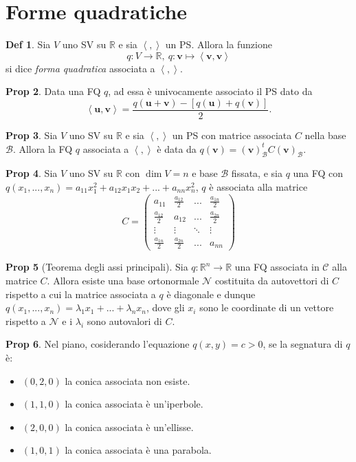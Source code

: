 \documentclass[]{article}
\newcommand{\vu}{\mathbf{u}}
\newcommand{\vv}{\mathbf{v}}
\newcommand{\scalprod}[2]{\left\langle #1 , #2 \right\rangle}
\theoremstyle{definition}
\theoremstyle{definition}
\newtheorem{prop}{Prop}[subsection]
\theoremstyle{definition}
\newtheorem{dfn}[prop]{Def}
\begin{document}
\section{Forme quadratiche} 

\begin{dfn} Sia $V$ uno SV su $\mathbb{R}$ e sia $\scalprod{}{}$ un PS. Allora la funzione $$q: V \to \mathbb{R}, \ q: \vv \mapsto \scalprod{\vv}{\vv}$$ si dice \emph{forma quadratica} associata a $\scalprod{}{}$.

\end{dfn} \begin{prop} Data una FQ $q$, ad essa è univocamente associato il PS dato da 
$$\scalprod{\vu}{\vv}=\frac{q(\vu + \vv ) - [q(\vu )+q(\vv )]}{2}.$$

\end{prop} \begin{prop} Sia $V$ uno SV su $\mathbb{R}$ e sia $\scalprod{}{}$ un PS con matrice associata $C$ nella base $\mathcal{B}$. Allora la FQ $q$ associata a $\scalprod{}{}$ è data da $q(\vv ) = (\vv)_{\mathcal{B}} ^t C (\vv)_{\mathcal{B}}$.

\end{prop} \begin{prop} Sia $V$ uno SV su $\mathbb{R}$ con $\dim V=n$ e base $\mathcal{B}$ fissata, e sia $q$ una FQ con $q(x_1 ,..., x_n) = a_{11} x_1 ^2 + a_{12} x_1 x_2 +...+ a_{nn} x_n ^2$, $q$ è associata alla matrice
$$C=\begin{pmatrix}
	a_{11}				& \frac{a_{12}}{2}	& ...		& \frac{a_{1n}}{2} 	\\
	\frac{a_{12}}{2}	& a_{12}			& ...		& \frac{a_{2n}}{2}	\\
	\vdots				& \vdots			& \ddots	& \vdots			\\
	\frac{a_{1n}}{2}	& \frac{a_{2n}}{2}	& ...		& a_{nn}			
\end{pmatrix}$$

\end{prop} \begin{prop}[Teorema degli assi principali] Sia $q: \mathbb{R}^n \to \mathbb{R}$ una FQ associata in $\mathcal{C}$ alla matrice $C$. Allora esiste una base ortonormale $\mathcal{N}$ costituita da autovettori di $C$ rispetto a cui la matrice associata a $q$ è diagonale e dunque $q(x_1 ,..., x_n ) = \lambda_1 x_1 +...+ \lambda_n x_n$, dove gli $x_i$ sono le coordinate di un vettore rispetto a $\mathcal{N}$ e i $\lambda _i$ sono autovalori di $C$.

\end{prop} \begin{prop} Nel piano, cosiderando l'equazione $q(x,y)=c >0$, se la segnatura di $q$ è:
\begin{itemize}
	\item $(0,2,0)$ la conica associata non esiste.
	\item $(1,1,0)$ la conica associata è un'iperbole.
	\item $(2,0,0)$ la conica associata è un'ellisse.
	\item $(1,0,1)$ la conica associata è una parabola.
\end{itemize}
\end{prop}
\end{document}
